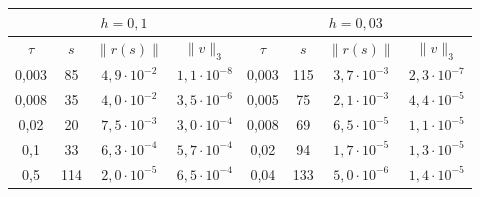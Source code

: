 \medskip





\begin{center}


\begin{tabular}{|c|c|c|c|c|c|c|c|}


\hline


\multicolumn{4}{|c|}{$h=0{,}1$}


&


\multicolumn{4}{|c|}{$h=0{,}03$} \\


\hline


$\tau$ & $s$ & $\|r(s)\|$ & $\|v\|_3$ &


$\tau$ & $s$ & $\|r(s)\|$ & $\|v\|_3$ \\


\hline


0{,}003 & 85 & $4{,}9\cdot 10^{-2}$ & $1{,}1\cdot 10^{-8}$ &


0,003 & 115 & $3{,}7\cdot 10^{-3}$ & $2{,}3\cdot 10^{-7}$ \\


\hline


0{,}008 & 35 & $4{,}0\cdot 10^{-2}$ & $3{,}5\cdot 10^{-6}$ &


0{,}005 & 75 & $2{,}1\cdot 10^{-3}$ & $4{,}4\cdot 10^{-5}$ \\


\hline


0{,}02 & 20 & $7{,}5\cdot 10^{-3}$ & $3{,}0\cdot 10^{-4}$ &


0{,}008 & 69 & $6{,}5\cdot 10^{-5}$ & $1{,}1\cdot 10^{-5}$ \\


\hline


0{,}1 & 33 & $6{,}3\cdot 10^{-4}$ & $5{,}7\cdot 10^{-4}$ &


0{,}02 & 94 & $1{,}7\cdot 10^{-5}$ & $1{,}3\cdot 10^{-5}$ \\


\hline


0{,}5 & 114 & $2{,}0\cdot 10^{-5}$ & $6{,}5\cdot 10^{-4}$ &


0{,}04 & 133 & $5{,}0\cdot 10^{-6}$ & $1{,}4\cdot 10^{-5}$ \\


\hline


\end{tabular}


\end{center}


